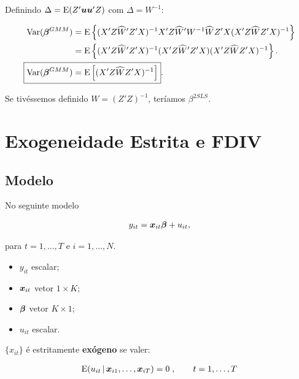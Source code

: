 \documentclass[11pt, oneside, a4paper, article]{article}
\numberwithin{equation}{section}
\begin{document}
\begin{description}
\noindent
Definindo $\Delta = \text{E}(Z' \boldsymbol{u}\boldsymbol{u}' Z)$ com $\Delta = W^{-1}$:

\vspace{-1 em}
\begin{align*}
\Var( \betavec^{GMM} ) &=
\E \left\{ 
( X' Z \widehat{W}' Z' X )^{-1}
X' Z \widehat{W}' W^{-1} \widehat{W} Z' X 
( X' Z \widehat{W} Z' X )^{-1}
\right\}
\\ &=
\E \left\{ 
( X' Z \widehat{W}' Z' X )^{-1}
( X' Z \widehat{W}' Z' X )
( X' Z \widehat{W} Z' X )^{-1}
\right\}.
\\
\Aboxed{
\Var( \betavec^{GMM} ) &=
\E \left[
( X' Z \widehat{W} Z' X )^{-1}
\right] }.
\end{align*}

\noindent
Se tivéssemos definido $W = (Z'Z)^{-1}$, teríamos $\beta^{2SLS}$.


\clearpage
\section{Exogeneidade Estrita e FDIV}


\subsection{Modelo}

No seguinte modelo

\vspace{-1 em}
\begin{align*} 
	y_{it} = \boldsymbol{x}_{it} \boldsymbol{\beta} + u_{it},
\end{align*}

\noindent
para
$t = 1, \dots, T$ e $i = 1, \dots, N$.

\begin{itemize}\itemsep0pt
\item
$y_{it}$ escalar;

\item
$\boldsymbol{x}_{it}$  vetor $1 \times K$;

\item
$\boldsymbol{\beta}$ vetor $K \times 1$;

\item
$u_{it}$ escalar.
\end{itemize}

\noindent
$\{x_{it}\}$ é estritamente \textbf{exógeno} se valer:

\vspace{-1 em}
\begin{align*}
	\text{E}( u_{it} \, | \, \boldsymbol{x}_{i1}, \dots, \boldsymbol{x}_{iT} ) = 0 \; , \qquad t = 1, \dots, T
\end{align*}


\end{description}
\end{document}
